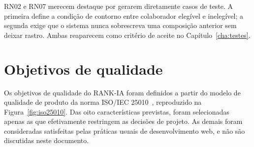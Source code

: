 \documentclass[a4paper,12pt,oneside,openany]{book}
\newif\iforientacoes
\newcommand{\orientacao}[1]{%
    \iforientacoes
        \begin{quote}
        \small\itshape\textbf{Orientação:} #1
        \end{quote}
    \fi
}
\begin{document}
RN02 e RN07 merecem destaque por gerarem diretamente casos de teste. A primeira
define a condição de contorno entre colaborador elegível e inelegível; a
segunda exige que o sistema nunca sobrescreva uma composição anterior sem
deixar rastro. Ambas reaparecem como critério de aceite no
Capítulo~\ref{cha:testes}.

\FloatBarrier

\section{Objetivos de qualidade}\label{sec:quality-goals}

\orientacao{Identifiquem os atributos de qualidade que realmente influenciam
as decisões de projeto, por exemplo: manutenibilidade, desempenho, segurança,
confiabilidade, usabilidade ou portabilidade. Podem ser utilizados modelos
como ISO/IEC 25010 ou FURPS+, desde que apenas os atributos relevantes ao
sistema sejam selecionados.}

Os objetivos de qualidade do RANK-IA foram definidos a partir do modelo de
qualidade de produto da norma ISO/IEC 25010~\citep{iso25010}, reproduzido na
Figura~\ref{fig:iso25010}. Das oito características previstas, foram
selecionadas apenas as que efetivamente restringem as decisões de projeto. As
demais foram consideradas satisfeitas pelas práticas usuais de desenvolvimento
web, e não são discutidas neste documento.
\end{document}
